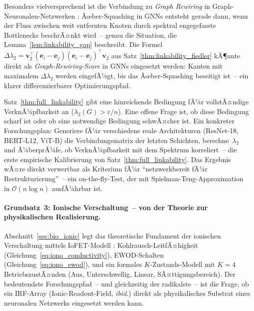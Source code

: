 ﻿\documentclass[12pt, a4paper, openany]{report}
\begin{document}
Besonders vielversprechend ist die Verbindung zu \emph{Graph Rewiring} in
Graph-Neuronalen-Netzwerken \cite{topping22}: Ãœber-Squashing in GNNs entsteht
gerade dann, wenn der Fluss zwischen weit entfernten Knoten durch spektral
engegefasste Bottlenecks beschrÃ¤nkt wird~-- genau die Situation, die
Lemma~\ref{lem:linkability_gap} beschreibt.  Die Formel
$\Delta\lambda_2 = \bm{v}_2^\top (\bm{e}_i - \bm{e}_j)(\bm{e}_i - \bm{e}_j)^\top \bm{v}_2$
aus Satz~\ref{thm:linkability_fiedler} kÃ¶nnte direkt als \emph{Graph-Rewiring-Score}
in GNNs eingesetzt werden: Kanten mit maximalem $\Delta\lambda_2$ werden
eingefÃ¼gt, bis das Ãœber-Squashing beseitigt ist~-- ein klarer differenzierbarer
Optimierungspfad.

Satz~\ref{thm:full_linkability} gibt eine hinreichende Bedingung fÃ¼r
vollstÃ¤ndige VerknÃ¼pfbarkeit an ($\lambda_2(G) > \varepsilon / n$).  Eine
offene Frage ist, ob diese Bedingung scharf ist oder ob eine notwendige
Bedingung schwÃ¤cher ist.  Ein konkreter Forschungsplan: Generiere fÃ¼r
verschiedene reale Architekturen (ResNet-18, BERT-L12, ViT-B) die
Verbindungsmatrix der letzten Schichten, berechne~$\lambda_2$ und Ã¼berprÃ¼fe,
ob VerknÃ¼pfbarkeit mit dem Spektrum korreliert~-- die erste empirische
Kalibrierung von Satz~\ref{thm:full_linkability}.  Das Ergebnis wÃ¤re direkt
verwertbar als Kriterium fÃ¼r ``netzwerkbereit fÃ¼r Restrukturierung''~-- ein
on-the-fly-Test, der mit Spielman-Teng-Approximation
\cite{spielman11} in $\mathcal{O}(n \log n)$ ausfÃ¼hrbar ist.

\paragraph{Grundsatz~3: Ionische Verschaltung~-- von der Theorie zur
  physikalischen Realisierung.}
Abschnitt~\ref{sec:bio_ionic} legt das theoretische Fundament der ionischen
Verschaltung mittels IoFET-Modell \cite{epp2026iono}: Kohlrausch-LeitfÃ¤higkeit
(Gleichung~\ref{eq:iono_conductivity}), EWOD-Schalten
(Gleichung~\ref{eq:iono_ewod}), und ein formales $K$-Zu\-stands-Modell mit
$K=4$ BetriebszustÃ¤nden (Aus, Unterschwellig, Linear, SÃ¤ttigungsbereich).
Der bedeutendste Forschungspfad~-- und gleichzeitig der radikalste~-- ist die
Frage, ob ein IRF-Array (Ionic-Readout-Field, \textit{ibid.}) direkt als
physikalisches Substrat eines neuronalen Netzwerks eingesetzt werden kann.
\end{document}
